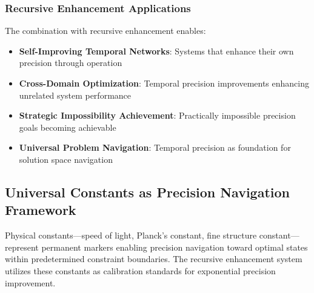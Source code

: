 \documentclass[12pt,a4paper]{article}
\begin{document}
{{{{{{{{{{{{{{\subsubsection{Recursive Enhancement Applications}

The combination with recursive enhancement enables:

\begin{itemize}
\item \textbf{Self-Improving Temporal Networks}: Systems that enhance their own precision through operation
\item \textbf{Cross-Domain Optimization}: Temporal precision improvements enhancing unrelated system performance
\item \textbf{Strategic Impossibility Achievement}: Practically impossible precision goals becoming achievable
\item \textbf{Universal Problem Navigation}: Temporal precision as foundation for solution space navigation
\end{itemize}

\subsection{Universal Constants as Precision Navigation Framework}

Physical constants—speed of light, Planck's constant, fine structure constant—represent permanent markers enabling precision navigation toward optimal states within predetermined constraint boundaries. The recursive enhancement system utilizes these constants as calibration standards for exponential precision improvement.

\begin{figure}[h]
\centering
{}
\end{figure}}}}}}}}}}}}}}}
\end{document}

